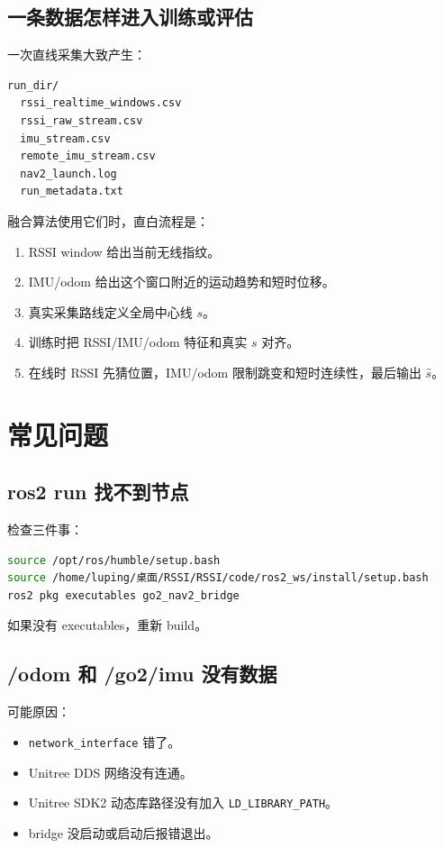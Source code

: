 \documentclass[UTF8,11pt,a4paper,openany]{ctexrep}
\newcommand{\code}[1]{\nolinkurl{#1}}
\newcommand{\param}[1]{\nolinkurl{#1}}
\begin{document}
\section{一条数据怎样进入训练或评估}

一次直线采集大致产生：

\begin{lstlisting}
run_dir/
  rssi_realtime_windows.csv
  rssi_raw_stream.csv
  imu_stream.csv
  remote_imu_stream.csv
  nav2_launch.log
  run_metadata.txt
\end{lstlisting}

融合算法使用它们时，直白流程是：

\begin{enumerate}
  \item RSSI window 给出当前无线指纹。
  \item IMU/odom 给出这个窗口附近的运动趋势和短时位移。
  \item 真实采集路线定义全局中心线 \(s\)。
  \item 训练时把 RSSI/IMU/odom 特征和真实 \(s\) 对齐。
  \item 在线时 RSSI 先猜位置，IMU/odom 限制跳变和短时连续性，最后输出 \(\hat{s}\)。
\end{enumerate}

\chapter{常见问题}

\section{ros2 run 找不到节点}

检查三件事：

\begin{lstlisting}[language=bash]
source /opt/ros/humble/setup.bash
source /home/luping/桌面/RSSI/RSSI/code/ros2_ws/install/setup.bash
ros2 pkg executables go2_nav2_bridge
\end{lstlisting}

如果没有 executables，重新 build。

\section{/odom 和 /go2/imu 没有数据}

可能原因：

\begin{itemize}
  \item \param{network_interface} 错了。
  \item Unitree DDS 网络没有连通。
  \item Unitree SDK2 动态库路径没有加入 \code{LD_LIBRARY_PATH}。
  \item bridge 没启动或启动后报错退出。
\end{itemize}
\end{document}
